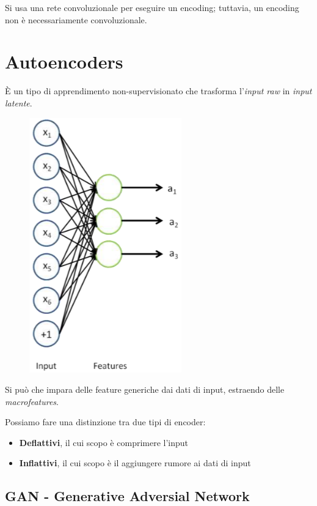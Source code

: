 \documentclass{report}
\begin{document}
\noindent Si usa una rete convoluzionale per eseguire un encoding; tuttavia, un encoding non è necessariamente convoluzionale.


\section{Autoencoders}

È un tipo di apprendimento non-supervisionato che trasforma l'\textit{input raw} in \textit{input latente}.

\begin{figure}[H]
    \centering
    \includegraphics[width=0.5\linewidth]{images/autoencoder.png}
\end{figure}


\noindent Si può che impara delle feature generiche dai dati di input, 
estraendo delle \textit{macrofeatures}.

\noindent Possiamo fare una distinzione tra due tipi di encoder:
\begin{itemize}
    \item \textbf{Deflattivi}, il cui scopo è comprimere l'input
    \item \textbf{Inflattivi}, il cui scopo è il aggiungere rumore ai dati di input 
\end{itemize}


\subsection{GAN - Generative Adversial Network}
\end{document}

